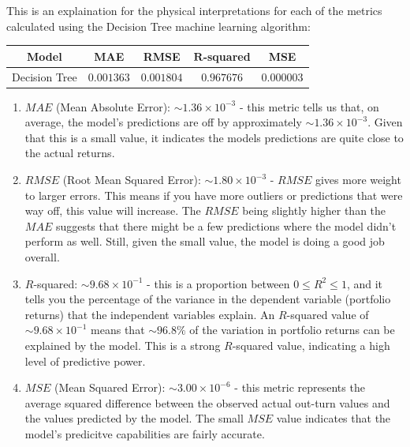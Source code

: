 \documentclass[a4paper,12pt,titlepage]{article}
\numberwithin{equation}{section}
\begin{document}
\begin{tcolorbox}[colback=red!5, colframe=red!75!black, title=\textbf{Decision Tree Model Analysis}]

This is an explaination for the physical interpretations for each of the metrics calculated using the 
Decision Tree machine learning algorithm:

\begin{center}
	
	\begin{tabular}{|c|c|c|c|c|}
	\hline
	\textbf{Model} & \textbf{MAE} & \textbf{RMSE} & \textbf{$\textbf{R}$-squared} & \textbf{MSE} \\
	\hline
	Decision Tree & $0.001363$ & $0.001804$ & $0.967676$ & $0.000003$ \\
	\hline
	\end{tabular}

\end{center}

\begin{enumerate}

	\item $MAE$ (Mean Absolute Error): $\sim 1.36 \times 10^{-3}$ - this metric tells us that, on average, the 
		model's predictions are off by approximately $\sim 1.36 \times 10^{-3}$. Given that this is a small 
		value, it indicates the models predictions are quite close to the actual returns.

	\item $RMSE$ (Root Mean Squared Error): $\sim 1.80 \times 10^{-3}$ - $RMSE$ gives more weight to larger errors. 
		This means if you have more outliers or predictions that were way off, this value will increase. 
		The $RMSE$ being slightly higher than the $MAE$ suggests that there might be a few predictions where the 
		model didn't perform as well. Still, given the small value, the model is doing a good job overall.

	\item $R$-squared: $\sim 9.68 \times 10^{-1}$ - this is a proportion between  $0 \leq R^{2} \leq 1$, and it 
	tells you the percentage of the variance in the dependent variable (portfolio returns) that the 
	independent variables explain. An $R$-squared value of $\sim 9.68 \times 10^{-1}$ means that 
	$\sim 96.8\%$ of the variation in portfolio returns can be explained by the model. This is a strong 
	$R$-squared value, indicating a high level of predictive power.

	\item $MSE$ (Mean Squared Error): $\sim 3.00 \times 10^{-6}$ - this metric represents the average squared 
		difference between the observed actual out-turn values and the values predicted by the model. 
		The small $MSE$ value indicates that the model's predicitve capabilities are fairly accurate.

\end{enumerate}

\end{tcolorbox}
\end{document}
